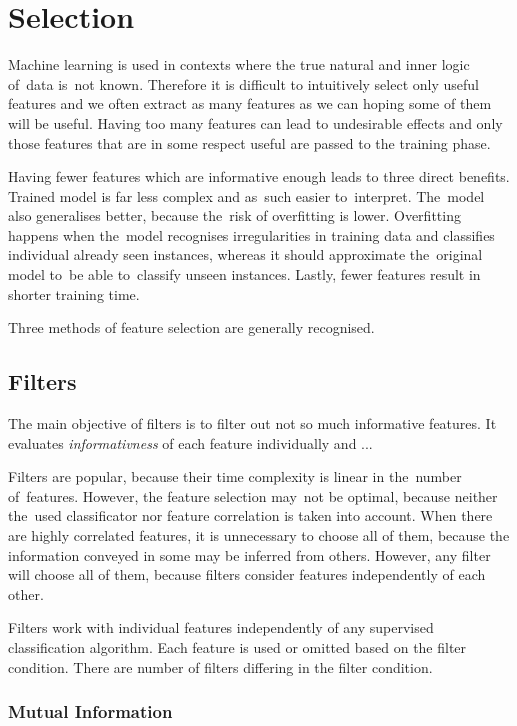 

\section{Selection}

Machine learning is used in contexts where the true natural and inner logic of~data is~not known.
Therefore it is difficult to intuitively select only useful features and we often extract as many features as we can hoping some of them will be useful.
Having too many features can lead to undesirable effects and only those features that are in some respect useful are passed to the training phase.

Having fewer features which are informative enough leads to three direct benefits.
Trained model is far less complex and as~such easier to~interpret.
The~model also generalises better, because the~risk of overfitting is lower.
Overfitting happens when the~model recognises irregularities in training data and classifies individual already seen instances, whereas it should approximate the~original model to~be able to~classify unseen instances.
Lastly, fewer features result in shorter training time.

Three methods of feature selection are generally recognised.


\subsection{Filters}

The main objective of filters is to filter out not so much informative features. It evaluates {\it informativness} of each feature individually and ...

Filters are popular, because their time complexity is linear in the~number of~features. However, the feature selection may~not be optimal, because neither the~used classificator nor feature correlation is taken into account. When there are highly correlated features, it is unnecessary to choose all of them, because the information conveyed in some may be inferred from others. However, any filter will choose all of them, because filters consider features independently of each other.

Filters work with individual features independently of any supervised classification algorithm. Each feature is used or omitted based on the filter condition. There are number of filters differing in the filter condition.

\subsubsection{Mutual Information}

